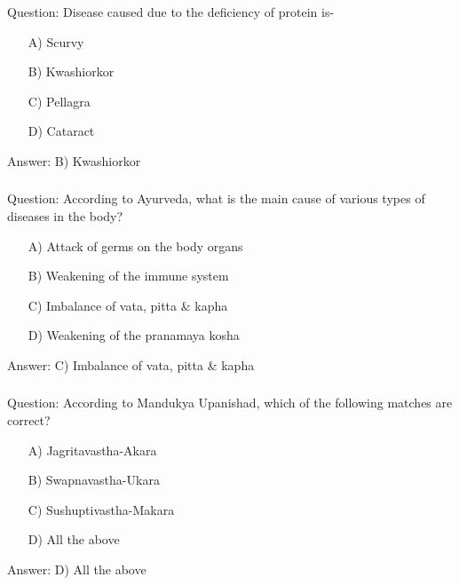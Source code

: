 \begin{frame}[fragile]\frametitle{}

Question: Disease caused due to the deficiency of protein is-

\begin{itemize}
\item[A)] Scurvy
\item[B)] Kwashiorkor
\item[C)] Pellagra
\item[D)] Cataract
\end{itemize}

Answer: B) Kwashiorkor
\end{frame}

\begin{frame}[fragile]\frametitle{}

Question: According to Ayurveda, what is the main cause of various types of diseases in the body?

\begin{itemize}
\item[A)] Attack of germs on the body organs
\item[B)] Weakening of the immune system
\item[C)] Imbalance of vata, pitta \& kapha
\item[D)] Weakening of the pranamaya kosha
\end{itemize}

Answer: C) Imbalance of vata, pitta \& kapha
\end{frame}

\begin{frame}[fragile]\frametitle{}

Question: According to Mandukya Upanishad, which of the following matches are correct?

\begin{itemize}
\item[A)] Jagritavastha-Akara
\item[B)] Swapnavastha-Ukara
\item[C)] Sushuptivastha-Makara
\item[D)] All the above
\end{itemize}

Answer: D) All the above
\end{frame}

